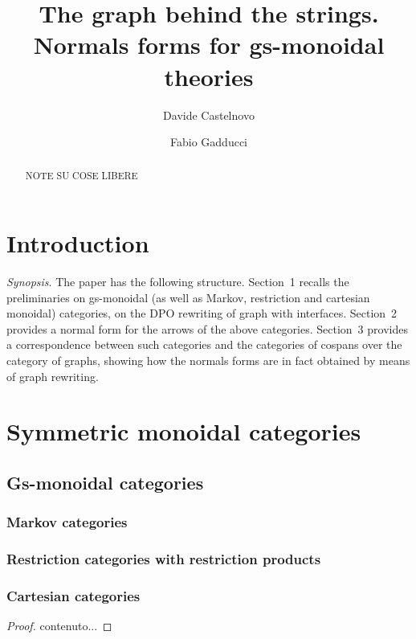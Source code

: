 \documentclass[a4paper,UKenglish,cleveref,pdftex,thm-restate,numberwithinsect]{lipics-v2021}
\author{Davide Castelnovo}
{Department of Computer Science, University of Pisa, Italy}
{castelnovod@gmail.com}
{https://orcid.org/0000-0002-5926-5615}{}
\author{Fabio Gadducci}
{Department of Computer Science, University of Pisa, Italy}
{fabio.gadducci@unipi.it}
{https://orcid.org/0000-0003-0690-3051}{}
\title{The graph behind the strings.\\ Normals forms for gs-monoidal theories}
\begin{document}
	\maketitle
\begin{abstract}
NOTE SU COSE LIBERE
\end{abstract}	

\tableofcontents
\section{Introduction}

\emph{Synopsis}. The paper has the following structure. Section~1 recalls the preliminaries on gs-monoidal  (as well as Markov, restriction and cartesian monoidal) categories,
on the DPO rewriting of graph with interfaces. Section~2 provides a normal form for the arrows of the above categories. Section~3 provides a correspondence between 
such categories and the categories of cospans over the category of graphs, showing how the normals forms are in fact obtained by means of graph rewriting.

\section{Symmetric monoidal categories}
\subsection{Gs-monoidal categories}
\subsubsection{Markov categories}


\subsubsection{Restriction categories with restriction products}


\subsubsection{Cartesian categories}

\begin{theorem}
	
\end{theorem}

\begin{proof}
	contenuto...
\end{proof}
\end{document}
